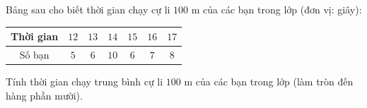 \begin{ex}
Bảng sau cho biết thời gian chạy cự li $100$ m của các bạn trong lớp (đơn vị: giây):
\begin{center}
\begin{tabular}{|c|c|c|c|c|c|c|}\hline
Thời gian & $12$ & $13$ & $14$ & $15$ & $16$ & $17$\\\hline
Số bạn & $5$ & $6$ & $10$ & $6$ & $7$ & $8$\\\hline
\end{tabular}
\end{center}
Tính thời gian chạy trung bình cự li $100$ m của các bạn trong lớp (làm tròn đến hàng phần mười).
\end{ex}
